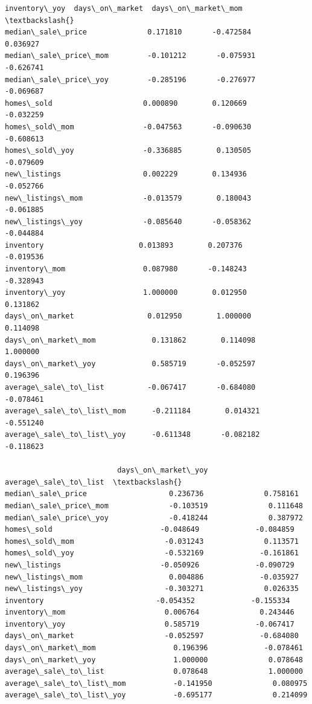 \documentclass[11pt]{article}
\begin{document}
\begin{Verbatim}[commandchars=\\\{\}]
                          inventory\_yoy  days\_on\_market  days\_on\_market\_mom  \textbackslash{}
median\_sale\_price              0.171810       -0.472584            0.036927   
median\_sale\_price\_mom         -0.101212       -0.075931           -0.626741   
median\_sale\_price\_yoy         -0.285196       -0.276977           -0.069687   
homes\_sold                     0.000890        0.120669           -0.032259   
homes\_sold\_mom                -0.047563       -0.090630           -0.608613   
homes\_sold\_yoy                -0.336885        0.130505           -0.079609   
new\_listings                   0.002229        0.134936           -0.052766   
new\_listings\_mom              -0.013579        0.180043           -0.061885   
new\_listings\_yoy              -0.085640       -0.058362           -0.044884   
inventory                      0.013893        0.207376           -0.019536   
inventory\_mom                  0.087980       -0.148243           -0.328943   
inventory\_yoy                  1.000000        0.012950            0.131862   
days\_on\_market                 0.012950        1.000000            0.114098   
days\_on\_market\_mom             0.131862        0.114098            1.000000   
days\_on\_market\_yoy             0.585719       -0.052597            0.196396   
average\_sale\_to\_list          -0.067417       -0.684080           -0.078461   
average\_sale\_to\_list\_mom      -0.211184        0.014321           -0.551240   
average\_sale\_to\_list\_yoy      -0.611348       -0.082182           -0.118623   

                          days\_on\_market\_yoy  average\_sale\_to\_list  \textbackslash{}
median\_sale\_price                   0.236736              0.758161   
median\_sale\_price\_mom              -0.103519              0.111648   
median\_sale\_price\_yoy              -0.418244              0.387972   
homes\_sold                         -0.048649             -0.084859   
homes\_sold\_mom                     -0.031243              0.113571   
homes\_sold\_yoy                     -0.532169             -0.161861   
new\_listings                       -0.050926             -0.090729   
new\_listings\_mom                    0.004886             -0.035927   
new\_listings\_yoy                   -0.303271              0.026335   
inventory                          -0.054352             -0.155334   
inventory\_mom                       0.006764              0.243446   
inventory\_yoy                       0.585719             -0.067417   
days\_on\_market                     -0.052597             -0.684080   
days\_on\_market\_mom                  0.196396             -0.078461   
days\_on\_market\_yoy                  1.000000              0.078648   
average\_sale\_to\_list                0.078648              1.000000   
average\_sale\_to\_list\_mom           -0.141950              0.080975   
average\_sale\_to\_list\_yoy           -0.695177              0.214099   


\end{Verbatim}
\end{document}
